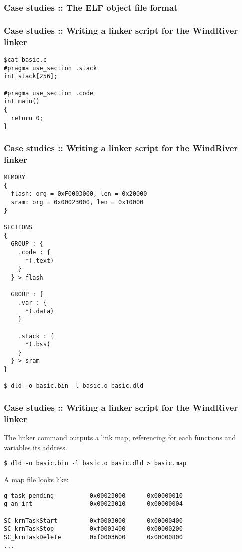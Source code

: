 
\begin{frame}
  \frametitle{Case studies :: The ELF object file format}


 \begin{center}
  \end{center}


\end{frame}


\begin{frame}[containsverbatim]
  \frametitle{Case studies :: Writing a linker script for the WindRiver linker}

\begin{verbatim}
$cat basic.c
#pragma use_section .stack
int stack[256];

#pragma use_section .code
int main()
{
  return 0;
}
\end{verbatim}

\end{frame}


\begin{frame}[containsverbatim]
  \frametitle{Case studies :: Writing a linker script for the WindRiver linker}

\begin{verbatim}
MEMORY
{
  flash: org = 0xF0003000, len = 0x20000
  sram: org = 0x00023000, len = 0x10000
}

SECTIONS
{
  GROUP : {
    .code : {
      *(.text)
    }
  } > flash

  GROUP : {
    .var : {
      *(.data)
    }

    .stack : {
      *(.bss)
    }
  } > sram
}

$ dld -o basic.bin -l basic.o basic.dld
\end{verbatim}

\end{frame}


\begin{frame}[containsverbatim]
  \frametitle{Case studies :: Writing a linker script for the WindRiver linker}

The linker command outputs a link map, referencing for each functions and variables its address.

\begin{verbatim}
$ dld -o basic.bin -l basic.o basic.dld > basic.map
\end{verbatim}

A map file looks like:

\begin{verbatim}
g_task_pending          0x00023000      0x00000010
g_an_int                0x00023010      0x00000004

SC_krnTaskStart         0xf0003000      0x00000400
SC_krnTaskStop          0xf0003400      0x00000200
SC_krnTaskDelete        0xf0003600      0x00000800
...
\end{verbatim}
\end{frame}



